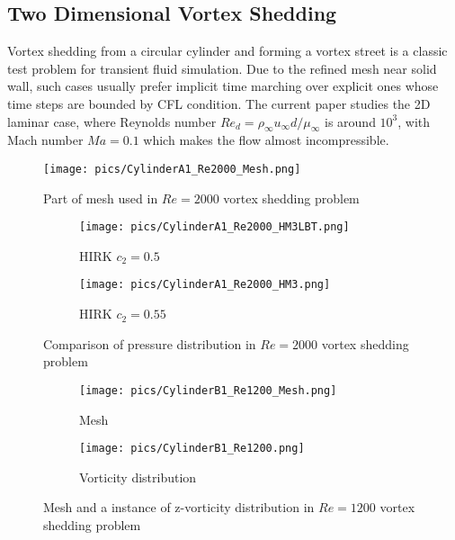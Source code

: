 \documentclass[preprint,12pt]{elsarticle}
\begin{document}
\subsection{Two Dimensional Vortex Shedding}

Vortex shedding from a circular cylinder and forming a vortex street
is a classic test problem for transient fluid simulation. Due to the refined
mesh near solid wall, such cases usually prefer implicit time marching
over explicit ones whose time steps are bounded by CFL condition.
The current paper studies the 2D laminar case, where
Reynolds number
$Re_d=\rho_\infty u_\infty d / \mu_\infty $ is around $10^3$,
with Mach number $Ma=0.1$ which makes the flow almost incompressible.

\begin{figure}[htbp]
    \centering
    \texttt{[image: pics/CylinderA1\_Re2000\_Mesh.png]}
    \caption[]{Part of mesh used in $Re=2000$ vortex shedding problem}
    \label{fig:CylinderRe2000_Mesh}
\end{figure}

\begin{figure}[htbp]
    \centering
    \begin{subfigure}{0.5\textwidth}
        \texttt{[image: pics/CylinderA1\_Re2000\_HM3LBT.png]}
        \caption[]{HIRK $c_2=0.5$}
        \label{sfig:CylinderRe2000_HM3LBT}
    \end{subfigure}\hfill
    \begin{subfigure}{0.5\textwidth}
        \texttt{[image: pics/CylinderA1\_Re2000\_HM3.png]}
        \caption[]{HIRK $c_2=0.55$}
        \label{sfig:CylinderRe2000_HM3}
    \end{subfigure}
    \caption[]{Comparison of pressure distribution in $Re=2000$ vortex shedding problem}
    \label{fig:CylinderRe2000}
\end{figure}

\begin{figure}[htbp]
    \centering
    \begin{subfigure}{0.5\textwidth}
        \texttt{[image: pics/CylinderB1\_Re1200\_Mesh.png]}
        \caption[]{Mesh}
        \label{sfig:CylinderRe1200Demo_Mesh}
    \end{subfigure}\hfill
    \begin{subfigure}{0.5\textwidth}
        \texttt{[image: pics/CylinderB1\_Re1200.png]}
        \caption[]{Vorticity distribution}
        \label{sfig:CylinderRe1200Demo_Vort}
    \end{subfigure}
    \caption[]{Mesh and a instance of z-vorticity distribution
        in $Re=1200$ vortex shedding problem}
    \label{fig:CylinderRe1200Demo}
\end{figure}
\end{document}
